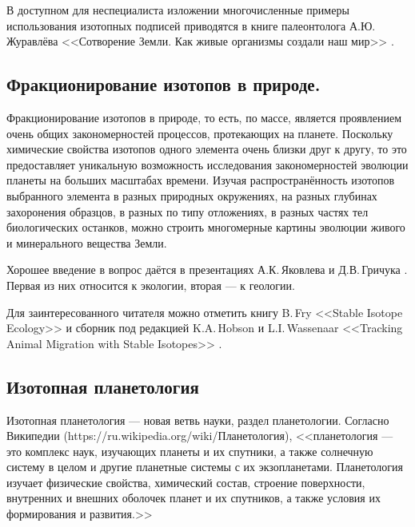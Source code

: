 \documentclass[a5paper,openany]{book}
\begin{document}
	В доступном для неспециалиста изложении многочисленные примеры использования изотопных подписей приводятся в книге палеонтолога А.Ю.\,Журавлёва <<Сотворение Земли. Как живые организмы создали наш мир>> \cite{Zhuravlev2019}.	
	
	\subsection{Фракционирование изотопов в природе.}	\label{IsotopeFractioning}
	Фракционирование изотопов в природе, то есть, по массе, является проявлением очень общих закономерностей процессов, протекающих на планете. Поскольку химические свойства изотопов одного элемента очень близки друг к другу, то это предоставляет уникальную возможность исследования закономерностей эволюции планеты на больших масштабах времени. Изучая распространённость изотопов выбранного элемента в разных природных окружениях, на разных глубинах захоронения образцов, в разных по типу отложениях, в разных частях тел биологических останков, можно строить многомерные картины эволюции живого и минерального вещества Земли.
	

Хорошее введение в вопрос даётся в презентациях А.К.\,Яковлева \cite{Iakovlev2013} и Д.В.\,Гричука \cite{Grichuk2022}. Первая из них относится к экологии, вторая --- к геологии.

Для заинтересованного читателя можно отметить книгу B.\,Fry <<Stable Isotope Ecology>> \cite{Fry2006} и сборник под редакцией K.A.\,Hobson и  L.I.\,Wassenaar  <<Tracking Animal Migration with Stable Isotopes>> \cite{HobsonWassenaar2018}. 




	\subsection{Изотопная планетология} \label{IsotopePlanetology} 


Изотопная планетология --- новая ветвь науки, раздел планетологии. 
Согласно Википедии (https://ru.wikipedia.org/wiki/Планетология),
<<планетология --- это комплекс наук, изучающих планеты и их спутники, а также солнечную систему в целом и другие планетные системы с их экзопланетами. Планетология изучает физические свойства, химический состав, строение поверхности, внутренних и внешних оболочек планет и их спутников, а также условия их формирования и развития.>>
\end{document}
